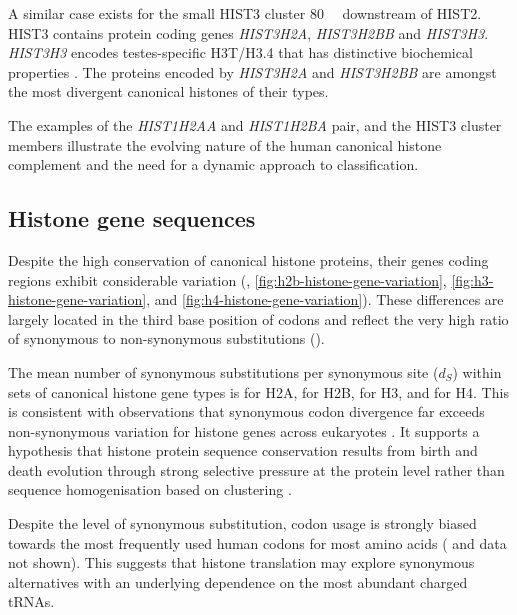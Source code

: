     \label{sec:hist3h3}
    A similar case exists for the small HIST3 cluster \SI{80}{\mega\bp} downstream of HIST2.
    HIST3 contains protein coding genes \textit{HIST3H2A}, \textit{HIST3H2BB} and \textit{HIST3H3}.
    \textit{HIST3H3} encodes testes-specific H3T/H3.4 
    that has distinctive biochemical properties \citep{WittExpCellRes1996,KurumizakaCOSB2013}.
    The proteins encoded by \textit{HIST3H2A} and \textit{HIST3H2BB}
    are amongst the most divergent canonical histones of their types.

    The examples of the \textit{HIST1H2AA} and \textit{HIST1H2BA} pair, 
    and the HIST3 cluster members illustrate 
    the evolving nature of the human canonical histone complement 
    and the need for a dynamic approach to classification.

  \subsection{Histone gene sequences}
    Despite the high conservation of canonical histone proteins,
    their genes coding regions exhibit considerable variation
    (, \ref{fig:h2b-histone-gene-variation},
    \ref{fig:h3-histone-gene-variation}, and \ref{fig:h4-histone-gene-variation}).
    These differences are largely located in the third base position of codons
    and reflect the very high ratio of synonymous to non-synonymous
    substitutions ().

    The mean number of synonymous substitutions per synonymous site ($d_S$)
    within sets of canonical histone gene types is
     \result{} for H2A,
     \result{} for H2B,
     \result{} for H3,
    and  \result{} for H4.
    This is consistent with observations that
    synonymous codon divergence far exceeds non-synonymous variation
    for histone genes across eukaryotes \citep{Piontkivska2002, Rooney2002}.
    It supports a hypothesis that histone protein sequence conservation
    results from birth and death evolution through strong selective pressure
    at the protein level rather than 
    sequence homogenisation based on clustering \citep{NeiRooney2005}.

    Despite the level of synonymous substitution,
    codon usage is strongly biased towards the most frequently used
    human codons for most amino acids ( and data not shown).
    This suggests that histone translation may explore synonymous alternatives
    with an underlying dependence on the most abundant charged tRNAs.

